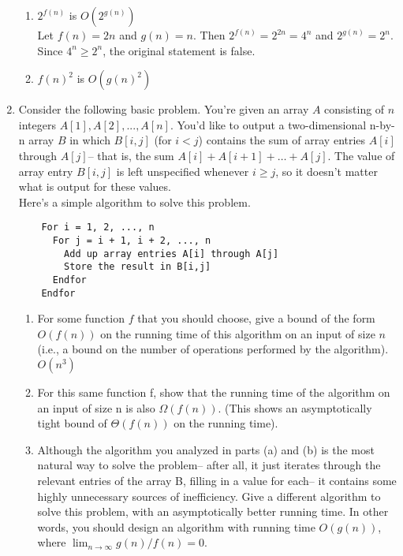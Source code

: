 \documentclass[12pt]{article}
\begin{document}
\begin{enumerate}
\begin{enumerate}
	\item $2^{f(n)}$ is $O(2^{g(n)})$\\
	Let $f(n) = 2n$ and $g(n) = n$. Then $2^{f(n)} = 2^{2n} = 4^n$ and $2^{g(n)} = 2^n$. Since $4^n \geq 2^n$, the original statement is false.
	
	\item $f(n)^2$ is $O(g(n)^2)$\\
	
	\end{enumerate}

\item Consider the following basic problem. You're given an array $A$ consisting of $n$ integers $A[1],A[2],...,A[n]$. You'd like to output a two-dimensional n-by-n array $B$ in which $B[i,j]$ (for $i < j$) contains the sum of array entries $A[i]$ through $A[j]$-- that is, the sum $A[i]+A[i+1]+\dots+A[j]$. The value of array entry $B[i,j]$ is left unspecified whenever $i \geq j$, so it doesn't matter what is output for these values.\\
Here's a simple algorithm to solve this problem.\\
\begin{verbatim}
	For i = 1, 2, ..., n
	  For j = i + 1, i + 2, ..., n
	    Add up array entries A[i] through A[j]
	    Store the result in B[i,j]
	  Endfor
	Endfor
\end{verbatim}

	\begin{enumerate}
	\item For some function $f$ that you should choose, give a bound of the form $O(f(n))$ on the running time of this algorithm on an input of size $n$ (i.e., a bound on the number of operations performed by the algorithm).\\
	$O(n^3)$
	\item For this same function f, show that the running time of the algorithm on an input of size n is also $\Omega(f(n))$. (This shows an asymptotically tight bound of $\Theta(f(n))$ on the running time).\\
	
	\item Although the algorithm you analyzed in parts (a) and (b) is the most natural way to solve the problem-- after all, it just iterates through the relevant entries of the array B, filling in a value for each-- it contains some highly unnecessary sources of inefficiency. Give a different algorithm to solve this problem, with an asymptotically better running time. In other words, you should design an algorithm with running time $O(g(n))$, where $\lim_{n\rightarrow\infty}g(n)/f(n) = 0$.
	\end{enumerate}
\end{enumerate}
\end{document}

